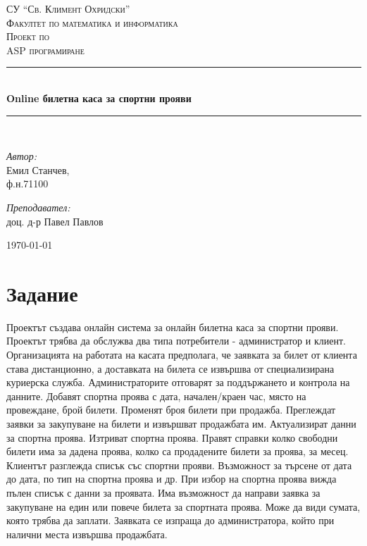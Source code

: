 \documentclass[a4paper,10pt, leqno]{article}
\newcommand{\HRule}{\rule{\linewidth}{0.5mm}}
\begin{document}
\begin{titlepage}
  \begin{center}
    \textsc{СУ ``Св. Климент Охридски''\\
    Факултет по математика и информатика
    }\\[5cm]

    \textsc{\large Проект по \\
    ASP програмиране
    }\\[0.5cm]
    \HRule \\[0.4cm]
    { \Large \bfseries Online билетна каса за спортни прояви
    }\\[0.4cm]
    \HRule \\[6cm]
    \begin{minipage}{0.49\textwidth}
      \begin{flushleft} \large
	\emph{Автор:}\\
	Емил Станчев,\\
	\small ф.н.71100
      \end{flushleft}
    \end{minipage}
    \begin{minipage}{0.49\textwidth}
      \begin{flushright} \large
	\emph{Преподавател:} \\
	доц. д-р Павел Павлов
      \end{flushright}
    \end{minipage}
    \vfill
    {\large \today}
  \end{center}
\end{titlepage}

\tableofcontents
\newpage

\section{Задание}
  Проектът създава онлайн система за онлайн билетна каса за
  спортни прояви. Проектът трябва да обслужва два типа
  потребители - администратор и клиент. Организацията на работата
  на касата предполага, че заявката за билет от клиента става
  дистанционно, а доставката на билета се извършва от
  специализирана куриерска служба.
  Администраторите отговарят за поддържането и контрола на
  данните. Добавят спортна проява с дата, начален/краен час,
  място на провеждане, брой билети. Променят броя билети при
  продажба. Преглеждат заявки за закупуване на билети и извършват
  продажбата им. Актуализират данни за спортна проява. Изтриват
  спортна проява. Правят справки колко свободни билети има за
  дадена проява, колко са продадените билети за проява, за месец.
  Клиентът разглежда списък със спортни прояви. Възможност за
  търсене от дата до дата, по тип на спортна проява и др. При
  избор на спортна проява вижда пълен списък с данни за проявата.
  Има възможност да направи заявка за закупуване на един или
  повече билета за спортната проява. Може да види сумата, която
  трябва да заплати. Заявката се изпраща до администратора, който
  при налични места извършва продажбата. 
\end{document}
